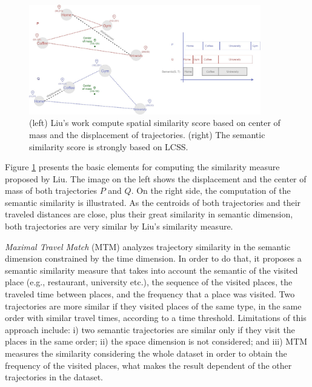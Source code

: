 \documentclass[12pt]{article}
\begin{document}
\begin{figure}[h]
\includegraphics[width=0.9\textwidth]{Related_Works/Semantic_Trajectories_(Liu).jpg}
\caption{\label{fig:related_trajes_Liu}(left) Liu's work compute spatial similarity score based on center of mass and the displacement of trajectories. (right) The semantic similarity score is strongly based on LCSS.}
\end{figure}

Figure \ref{fig:related_trajes_Liu} presents the basic elements for computing the similarity measure proposed by Liu. The image on the left shows the displacement and the center of mass of both trajectories $P$ and $Q$. On the right side, the computation of the semantic similarity is illustrated. As the centroids of both trajectories and their traveled distances are close, plus their great similarity in semantic dimension, both trajectories are very similar by Liu's similarity measure.

\emph{Maximal Travel Match} (MTM)\cite{Xiao:2010:FSU:1869790.1869857} analyzes trajectory similarity in the semantic dimension constrained by the time dimension. In order to do that, it proposes a semantic similarity measure that takes into account the semantic of the visited place (e.g., restaurant, university etc.), the sequence of the visited places, the traveled time between places, and the frequency that a place was visited. Two trajectories are more similar if they visited places of the same type, in the same order with similar travel times, according to a time threshold. Limitations of this approach include: i) two semantic trajectories are similar only if they visit the places in the same order; ii) the space dimension is not considered; and iii) MTM measures the similarity considering the whole dataset in order to obtain the frequency of the visited places, what makes the result dependent of the other trajectories in the dataset.

\end{document}
